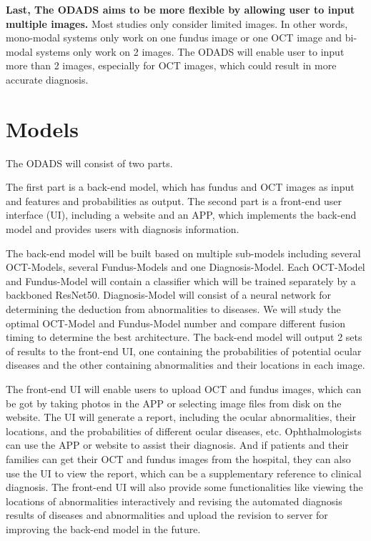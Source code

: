\documentclass{article}
\begin{document}
		\vspace{0.1cm}

		\textbf{Last, The ODADS aims to be more flexible by allowing user to input multiple images.}  Most studies only consider limited images.  In other words, mono-modal systems only work on one fundus image or one OCT image and bi-modal systems only work on 2 images.  The ODADS will enable user to input more than 2 images, especially for OCT images, which could result in more accurate diagnosis. 
		
	\section{Models}
		
		The ODADS will consist of two parts. 
		
		The first part is a back-end model, which has fundus and OCT images as input and features and probabilities as output. The second part is a front-end user interface (UI), including a website and an APP, which implements the back-end model and provides users with diagnosis information.
		
		The back-end model will be built based on multiple sub-models including several OCT-Models, several Fundus-Models and one Diagnosis-Model.  Each OCT-Model and Fundus-Model will contain a classifier which will be trained separately by a backboned ResNet50.  Diagnosis-Model will consist of a neural network for determining the deduction from abnormalities to diseases.  We will study the optimal OCT-Model and Fundus-Model number and compare different fusion timing to determine the best architecture.  The back-end model will output 2 sets of results to the front-end UI, one containing the probabilities of potential ocular diseases and the other containing abnormalities and their locations in each image.
		
		The front-end UI will enable users to upload OCT and fundus images, which can be got by taking photos in the APP or selecting image files from disk on the website. The UI will generate a report, including the ocular abnormalities, their locations, and the probabilities of different ocular diseases, etc. Ophthalmologists can use the APP or website to assist their diagnosis. And if patients and their families can get their OCT and fundus images from the hospital, they can also use the UI to view the report, which can be a supplementary reference to clinical diagnosis.  The front-end UI will also provide some functionalities like viewing the locations of abnormalities interactively and revising the automated diagnosis results of diseases and abnormalities and upload the revision to server for improving the back-end model in the future.
	
\end{document}
